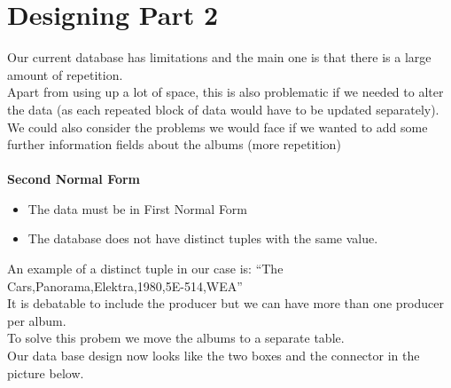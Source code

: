 \documentclass[a4paper,12pt]{article}
\begin{document}
\section{Designing Part 2}
Our current database has limitations and the main one is that there is a large amount of repetition.\\
Apart from using up a lot of space, this is also problematic if we needed to alter the data (as each repeated block of data would have to be updated separately).\\
We could also consider the problems we would face if we wanted to add some further information fields about the albums (more repetition)\\\\
\textbf{Second Normal Form}
\begin{itemize}
	\item The data must be in First Normal Form
	\item The database does not have distinct tuples with the same value.
\end{itemize}
An example of a distinct tuple in our case is:  ``The Cars,Panorama,Elektra,1980,5E-514,WEA''\\
It is debatable to include the producer but we can have more than one producer per album.\\

To solve this probem we move the albums to a separate table.\\
Our data base design now looks like the two boxes and the connector in the picture below.
\end{document}
